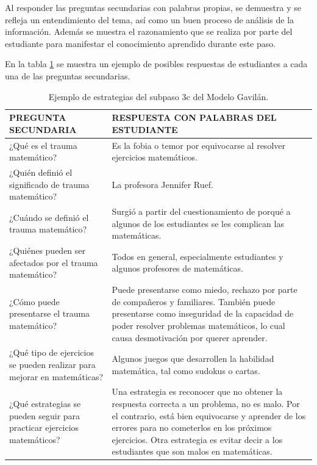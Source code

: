 Al responder las preguntas secundarias con palabras propias, se demuestra y se refleja un entendimiento del tema, así como un buen proceso de análisis de la información. Además se muestra el razonamiento que se realiza por parte del estudiante para manifestar el conocimiento aprendido durante este paso.

En la tabla \ref{tab:t7} se muestra un ejemplo de posibles respuestas de estudiantes a cada una de las preguntas secundarias.

\begin{table}[H]
  \begin{center}
    \begin{tabular}{ | p{8cm} | p{8cm} | }
      \hline
      PREGUNTA SECUNDARIA & RESPUESTA CON PALABRAS DEL ESTUDIANTE \\ \hline
      ¿Qué es el trauma matemático? & Es la fobia o temor por equivocarse al resolver ejercicios matemáticos. \\ \hline
      ¿Quién definió el significado de trauma matemático? & La profesora Jennifer Ruef. \\ \hline
      ¿Cuándo se definió el trauma matemático? & Surgió a partir del cuestionamiento de porqué a algunos de los estudiantes se les complican las matemáticas. \\ \hline
      ¿Quiénes pueden ser afectados por el trauma matemático? & Todos en general, especialmente estudiantes y algunos profesores de matemáticas. \\ \hline
      ¿Cómo puede presentarse el trauma matemático? & Puede presentarse como miedo, rechazo por parte de compañeros y familiares. También puede presentarse como inseguridad de la capacidad de poder resolver problemas matemáticos, lo cual causa desmotivación por querer aprender. \\ \hline
      ¿Qué tipo de ejercicios se pueden realizar para mejorar en matemáticas? & Algunos juegos que desarrollen la habilidad matemática, tal como sudokus o cartas. \\ \hline
      ¿Qué estrategias se pueden seguir para practicar ejercicios matemáticos? & Una estrategia es reconocer  que no obtener la respuesta correcta a un problema, no es malo. Por el contrario, está bien equivocarse y aprender de los errores para no cometerlos en los próximos ejercicios. Otra estrategia es evitar decir a los estudiantes que son malos en matemáticas.
       \\ \hline
    \end{tabular}
    \caption{Ejemplo de estrategias del subpaso 3c del Modelo Gavilán.}
    \label{tab:t7}
  \end{center}
\end{table}


